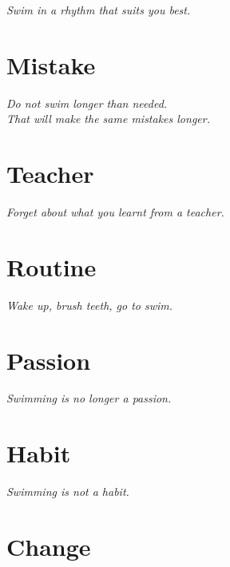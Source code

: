 \documentclass[11pt, openany]{book}
\begin{document}
\begin{center}
  {\Large\itshape\color{deepwater} Swim in a rhythm that suits you best.}
\end{center}

\chapter{Mistake}

\begin{center}
  {\Large\itshape\color{deepwater} Do not swim longer than needed.}\\[0.8em]
  {\Large\itshape\color{deepwater} That will make the same mistakes longer.}
\end{center}

\chapter{Teacher}

\begin{center}
  {\Large\itshape\color{deepwater} Forget about what you learnt from a teacher.}
\end{center}

\chapter{Routine}

\begin{center}
  {\Large\itshape\color{deepwater} Wake up, brush teeth, go to swim.}
\end{center}

\chapter{Passion}

\begin{center}
  {\Large\itshape\color{deepwater} Swimming is no longer a passion.}
\end{center}

\chapter{Habit}

\begin{center}
  {\Large\itshape\color{deepwater} Swimming is not a habit.}
\end{center}

\chapter{Change}
\end{document}
